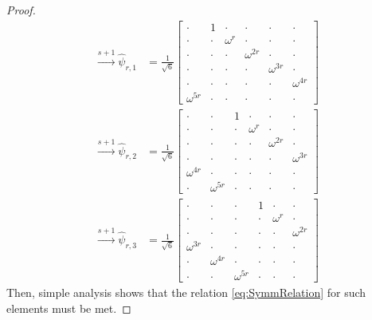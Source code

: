\documentclass[reqno]{amsart}
\theoremstyle{plain}
\theoremstyle{note}
\begin{document}
\begin{proof}
\begin{align}
    \xrightarrow{s+1} \hat{\psi}_{r,1} &= \frac{1}{\sqrt{6}} \left[
    \begin{array}{cccccc}
        \cdot & 1 & \cdot & \cdot & \cdot & \cdot \\
        \cdot & \cdot & \omega^r & \cdot & \cdot & \cdot \\
        \cdot & \cdot & \cdot & \omega^{2r} & \cdot & \cdot \\
        \cdot & \cdot & \cdot & \cdot & \omega^{3r} & \cdot \\
        \cdot & \cdot & \cdot & \cdot & \cdot & \omega^{4r} \\
        \omega^{5r} & \cdot & \cdot & \cdot & \cdot & \cdot
    \end{array} \right] \nonumber \\
    \xrightarrow{s+1}\hat{\psi}_{r,2} &= \frac{1}{\sqrt{6}} \left[
    \begin{array}{cccccc}
        \cdot & \cdot & 1 & \cdot & \cdot & \cdot \\
        \cdot & \cdot & \cdot & \omega^r & \cdot & \cdot \\
        \cdot & \cdot & \cdot & \cdot & \omega^{2r} & \cdot \\
        \cdot & \cdot & \cdot & \cdot & \cdot & \omega^{3r} \\
        \omega^{4r} & \cdot & \cdot & \cdot & \cdot & \cdot \\
        \cdot & \omega^{5r} & \cdot & \cdot & \cdot & \cdot
    \end{array} \right] \nonumber \\
    \xrightarrow{s+1}\hat{\psi}_{r,3} &= \frac{1}{\sqrt{6}} \left[
    \begin{array}{ccc|ccc}
        \cdot & \cdot & \cdot & 1 & \cdot & \cdot \\
        \cdot & \cdot & \cdot & \cdot & \omega^r & \cdot \\
        \cdot & \cdot & \cdot & \cdot & \cdot & \omega^{2r} \\
        \hline
        \omega^{3r} & \cdot & \cdot & \cdot & \cdot & \cdot \\
        \cdot & \omega^{4r} & \cdot & \cdot & \cdot & \cdot \\
        \cdot & \cdot & \omega^{5r} & \cdot & \cdot & \cdot
    \end{array} \right]\nonumber
\end{align}
\normalsize
Then, simple analysis shows that the relation \eqref{eq:SymmRelation} for such elements must be met. 
\end{proof}
\end{document}
